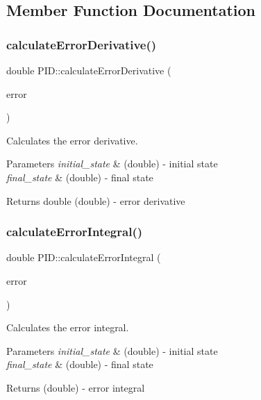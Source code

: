 \subsection{Member Function Documentation}
\mbox{\label{classPID_a58446fa1dd31e998351133adbfe0d37c}} 
\subsubsection{\texorpdfstring{calculate\+Error\+Derivative()}{calculateErrorDerivative()}}
{\footnotesize\ttfamily double P\+I\+D\+::calculate\+Error\+Derivative (\begin{DoxyParamCaption}\item[{double}]{error }\end{DoxyParamCaption})}



Calculates the error derivative. 


\begin{DoxyParams}{Parameters}
{\em initial\+\_\+state} & (double) -\/ initial state \\
\hline
{\em final\+\_\+state} & (double) -\/ final state \\
\hline
\end{DoxyParams}
\begin{DoxyReturn}{Returns}
double (double) -\/ error derivative 
\end{DoxyReturn}
\mbox{\label{classPID_ac3e8ba5eef028a4c61af628bbd351734}} 
\subsubsection{\texorpdfstring{calculate\+Error\+Integral()}{calculateErrorIntegral()}}
{\footnotesize\ttfamily double P\+I\+D\+::calculate\+Error\+Integral (\begin{DoxyParamCaption}\item[{double}]{error }\end{DoxyParamCaption})}



Calculates the error integral. 


\begin{DoxyParams}{Parameters}
{\em initial\+\_\+state} & (double) -\/ initial state \\
\hline
{\em final\+\_\+state} & (double) -\/ final state \\
\hline
\end{DoxyParams}
\begin{DoxyReturn}{Returns}
(double) -\/ error integral 
\end{DoxyReturn}
\mbox{\label{classPID_a5ea88b2d321c2c1f24aded4bd660c7c4}} 
